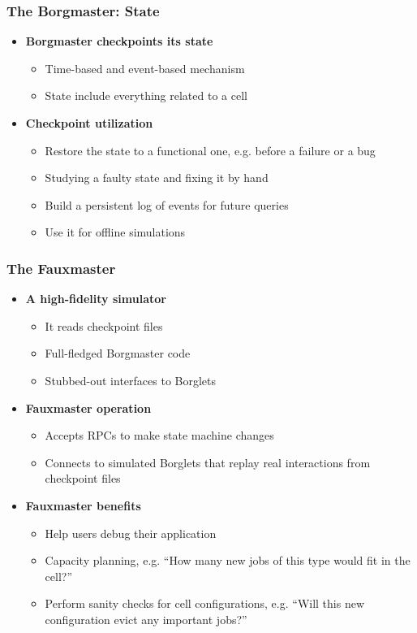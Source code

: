 \begin{frame}
\frametitle{The Borgmaster: State}
\begin{itemize}
	\item {\bf Borgmaster checkpoints its state}
	\begin{itemize}
		\item Time-based and event-based mechanism
		\item State include everything related to a cell
	\end{itemize}

\vspace{20pt}

	\item {\bf Checkpoint utilization}
	\begin{itemize}
		\item Restore the state to a functional one, e.g. before a failure or a bug
		\item Studying a faulty state and fixing it by hand
		\item Build a persistent log of events for future queries
		\item Use it for offline simulations
	\end{itemize}
\end{itemize}
\end{frame}

\begin{frame}
\frametitle{The Fauxmaster}
\begin{itemize}
	\item {\bf A high-fidelity simulator}
	\begin{itemize}
		\item It reads checkpoint files
		\item Full-fledged Borgmaster code
		\item Stubbed-out interfaces to Borglets
	\end{itemize}
	\item {\bf Fauxmaster operation}
	\begin{itemize}
		\item Accepts RPCs to make state machine changes
		\item Connects to simulated Borglets that replay real interactions from checkpoint files
	\end{itemize}
	\item {\bf Fauxmaster benefits}
	\begin{itemize}
		\item Help users debug their application
		\item Capacity planning, e.g. ``How many new jobs of this type would fit in the cell?''
		\item Perform sanity checks for cell configurations, e.g. ``Will this new configuration evict any important jobs?''
	\end{itemize}
\end{itemize}
\end{frame}

